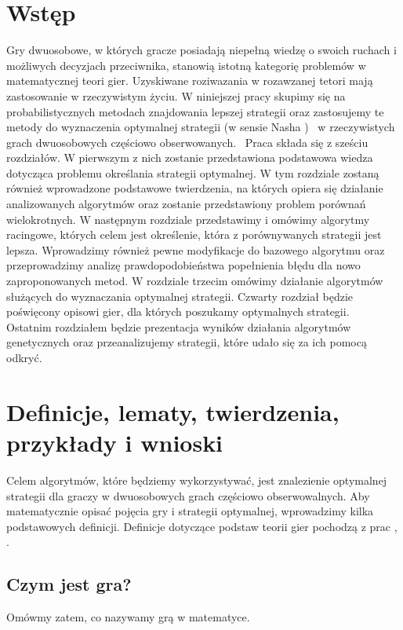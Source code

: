 \documentclass[inzynierska]{pwr_wmat_praca_dyplomowa}
\theoremstyle{plain}
\numberwithin{theorem}{chapter}
\theoremstyle{definition}
\numberwithin{theorem}{chapter}
\begin{document}
\frontmatter
\maketitle
\mainmatter
\tableofcontents
{\backmatter \chapter{Wstęp}} 
Gry dwuosobowe, w których gracze posiadają niepełną wiedzę o swoich ruchach i możliwych decyzjach przeciwnika, stanowią istotną kategorię problemów w matematycznej teori gier. Uzyskiwane roziwazania w rozawzanej tetori mają zastosowanie w rzeczywistym życiu.
W niniejszej pracy skupimy się na probabilistycznych metodach znajdowania lepszej strategii oraz zastosujemy te metody do wyznaczenia optymalnej strategii (w sensie Nasha \cite{Von_Stengel_2002})  w rzeczywistych grach dwuosobowych częściowo obserwowanych. 
Praca składa się z sześciu rozdziałów. W pierwszym z nich zostanie przedstawiona podstawowa wiedza dotycząca problemu określania strategii optymalnej. W tym rozdziale zostaną również wprowadzone podstawowe twierdzenia, na których opiera się działanie analizowanych algorytmów oraz zostanie przedstawiony problem porównań wielokrotnych.
W następnym rozdziale przedstawimy i omówimy algorytmy racingowe, których celem jest określenie, która z porównywanych strategii jest lepsza. Wprowadzimy również pewne modyfikacje do bazowego algorytmu oraz przeprowadzimy analizę prawdopodobieństwa popełnienia błędu dla nowo zaproponowanych metod. W rozdziale trzecim omówimy działanie algorytmów służących do wyznaczania optymalnej strategii. Czwarty rozdział będzie poświęcony opisowi gier, dla których poszukamy optymalnych strategii.  Ostatnim rozdziałem będzie prezentacja wyników działania algorytmów genetycznych oraz przeanalizujemy strategii, które udało się za ich pomocą odkryć.

\chapter{Definicje, lematy, twierdzenia, przykłady i wnioski}
Celem algorytmów, które będziemy wykorzystywać, jest znalezienie optymalnej strategii dla graczy w dwuosobowych grach częściowo obserwowalnych. Aby matematycznie opisać pojęcia gry i strategii optymalnej, wprowadzimy kilka podstawowych definicji.
Definicje dotyczące podstaw teorii gier pochodzą z prac \cite{platkowski2012wstkep}, \cite{prisner2014game}.

\section{Czym jest gra?}
Omówmy zatem, co nazywamy grą w matematyce.
\end{document}

